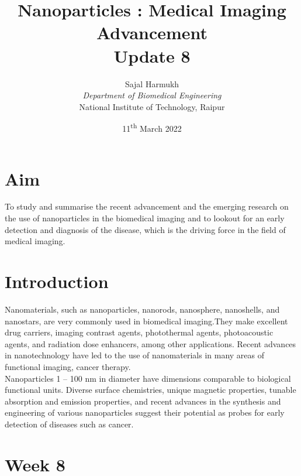 \documentclass{article}
\title{\textbf{Nanoparticles : Medical Imaging Advancement\\Update 8}}
\author{Sajal Harmukh \\ \textit{Department of Biomedical Engineering} \\ National Institute of Technology, Raipur }
\date{11\textsuperscript{th} March 2022}
\begin{document}
\maketitle

\section*{Aim}
\large
To study and summarise the recent advancement and the emerging research on the use of nanoparticles in the biomedical imaging and to lookout for an early detection and diagnosis of the disease, which is the driving force in the field of medical imaging.

\section*{Introduction}
Nanomaterials, such as nanoparticles, nanorods, nanosphere, nanoshells, and nanostars, are
very commonly used in biomedical imaging.They make excellent drug carriers, imaging contrast agents, photothermal agents, photoacoustic agents, and radiation dose enhancers, among other applications. Recent advances in nanotechnology have led to the use of nanomaterials
in many areas of functional imaging, cancer therapy.\\ Nanoparticles 1 – 100 nm in diameter have dimensions comparable to biological functional units. Diverse surface chemistries, unique magnetic properties, tunable absorption and emission properties, and recent advances in the synthesis and engineering of various nanoparticles suggest their potential as probes for early detection of diseases such as cancer.
 


\section*{Week 8 }
\end{document}
